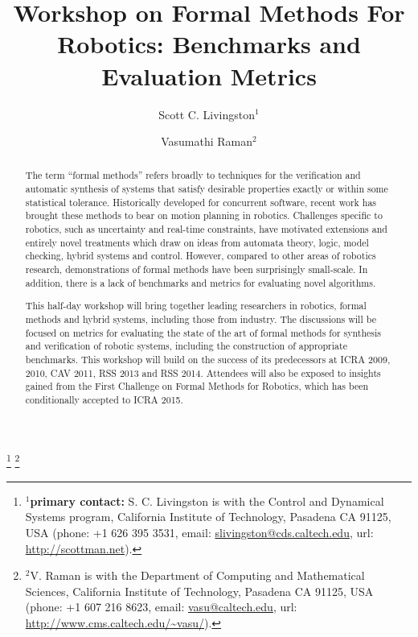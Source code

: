 \documentclass{amsart}
\begin{document}
\title{Workshop on Formal Methods For Robotics: Benchmarks and Evaluation Metrics}
\author[Scott C. Livingston]{Scott C. Livingston$^{1}$}
\author[Vasumathi Raman]{Vasumathi Raman$^{2}$}
\thanks{$^{1}$\textbf{primary contact:} S. C. Livingston is with the Control and Dynamical Systems program, California Institute of Technology, Pasadena CA 91125, USA (phone: +1 626 395 3531, email: \href{mailto:slivingston@cds.caltech.edu}{slivingston@cds.caltech.edu}, url: \url{http://scottman.net}).}%
\thanks{$^{2}$V. Raman is with the Department of Computing and Mathematical Sciences, California Institute of Technology, Pasadena CA 91125, USA (phone: +1 607 216 8623, email: \href{mailto:vasu@caltech.edu}{vasu@caltech.edu}, url: \url{http://www.cms.caltech.edu/~vasu/}).}%

\begin{abstract} %
The term ``formal methods'' refers broadly to techniques for the verification and automatic synthesis of systems that satisfy desirable properties exactly or within some statistical tolerance.  Historically developed for concurrent software, recent work has brought these methods to bear on motion planning in robotics. Challenges specific to robotics, such as uncertainty and
real-time constraints, have motivated extensions and entirely novel treatments which draw on ideas from automata theory, logic, model checking, hybrid systems and control.  However, compared to other areas of robotics research, demonstrations of formal methods have been surprisingly small-scale. In addition, there is a lack of benchmarks and metrics for evaluating novel algorithms.

This half-day workshop will bring together leading researchers in robotics, formal methods and hybrid systems, including those from industry. The discussions will be focused on metrics for evaluating the state of the art of formal methods for synthesis and verification of robotic systems, including the construction of appropriate benchmarks. This workshop will build on the success of its predecessors at ICRA 2009, 2010, CAV 2011, RSS 2013 and RSS 2014. Attendees will also be exposed to insights gained from the First Challenge on Formal Methods for Robotics, which has been conditionally accepted to ICRA 2015.

\end{abstract}
\maketitle
\end{document}
